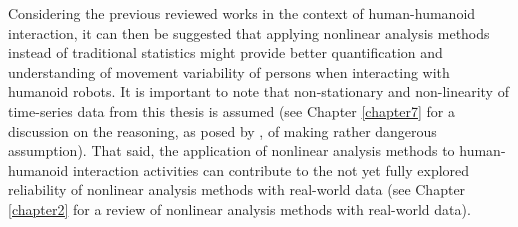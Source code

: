 Considering the previous reviewed works in the context 
of human-humanoid interaction, it can then be suggested that applying 
nonlinear analysis methods instead of traditional 
statistics might provide better quantification 
and understanding of movement variability of persons 
when interacting with humanoid robots.
It is important to note that non-stationary and non-linearity 
of time-series data from this thesis is assumed 
(see Chapter \ref{chapter7} for a discussion
on the reasoning, as posed by \citep{schreiber2000},
of making rather dangerous assumption).
That said, the application of nonlinear analysis methods 
to human-humanoid interaction activities can contribute 
to the not yet fully explored reliability of 
nonlinear analysis methods with real-world data 
(see Chapter \ref{chapter2} for a review of 
nonlinear analysis methods with real-world data).

